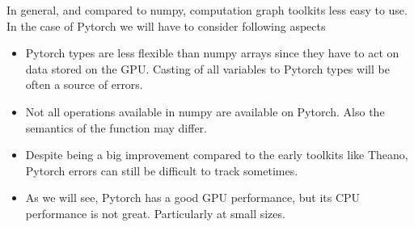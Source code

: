 In general, and compared to numpy, computation graph toolkits less easy to use.
In the case of Pytorch we will have to consider following aspects 

\begin{itemize}
\item Pytorch types are less flexible than numpy arrays since they have to act on data stored on the GPU. Casting of all variables to Pytorch types will be often a source of errors.
\item Not all operations available in numpy are available on Pytorch. Also the semantics of the function may differ.
\item Despite being a big improvement compared to the early toolkits like Theano, Pytorch errors can still be difficult to track sometimes.
\item As we will see, Pytorch has a good GPU performance, but its CPU performance is not great. Particularly at small sizes. 
\end{itemize}



